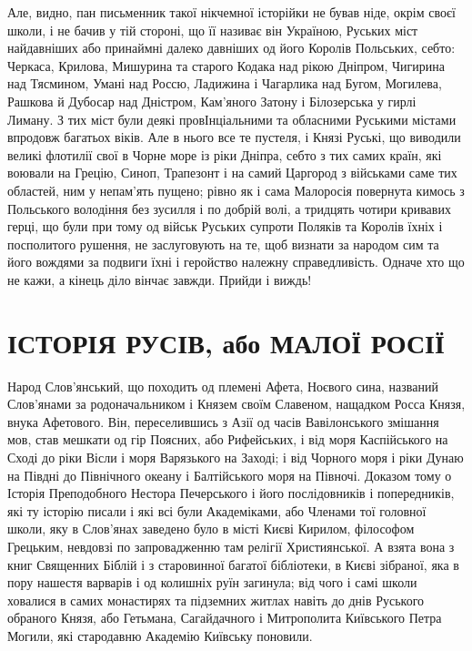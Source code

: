 Але, видно, пан письменник такої нікчемної історійки не бував ніде, окрім своєї
школи, і не бачив у тій стороні, що її називає він Україною, Руських міст
найдавніших або принаймні далеко давніших од його Королів Польських, себто:
Черкаса, Крилова, Мишурина та старого Кодака над рікою Дніпром, Чигирина над
Тясмином, Умані над Россю, Ладижина і Чагарлика над Бугом, Могилева, Рашкова й
Дубосар над Дністром, Кам'яного Затону і Білозерська у гирлі Лиману. З тих міст
були деякі провІнціальними та обласними Руськими містами впродовж багатьох
віків. Але в нього все те пустеля, і Князі Руські, що виводили великі флотилії
свої в Чорне море із ріки Дніпра, себто з тих самих країн, які воювали на
Грецію, Синоп, Трапезонт і на самий Царгород з військами саме тих областей, ним
у непам'ять пущено; рівно як і сама Малоросія повернута кимось з Польського
володіння без зусилля і по добрій волі, а тридцять чотири кривавих герці, що
були при тому од військ Руських супроти Поляків та Королів їхніх і посполитого
рушення, не заслуговують на те, щоб визнати за народом сим та його вождями за
подвиги їхні і геройство належну справедливість. Одначе хто що не кажи, а
кінець діло вінчає завжди. Прийди і виждь!

\section{ІСТОРІЯ РУСІВ, або МАЛОЇ РОСІЇ}

Народ Слов'янський, що походить од племені Афета, Ноєвого сина, названий
Слов'янами за родоначальником і Князем своїм Славеном, нащадком Росса Князя,
внука Афетового. Він, переселившись з Азії од часів Вавілонського змішання мов,
став мешкати од гір Поясних, або Рифейських, і від моря Каспійського на Сході
до ріки Вісли і моря Варязького на Заході; і від Чорного моря і ріки Дунаю на
Півдні до Північного океану і Балтійського моря на Півночі. Доказом тому о
Історія Преподобного Нестора Печерського і його послідовників і попередників,
які ту історію писали і які всі були Академіками, або Членами тої головної
школи, яку в Слов'янах заведено було в місті Києві Кирилом, філософом Грецьким,
невдовзі по запровадженню там релігії Християнської. А взята вона з книг
Священних Біблій і з старовинної багатої бібліотеки, в Києві зібраної, яка в
пору нашестя варварів і од колишніх руїн загинула; від чого і самі школи
ховалися в самих монастирях та підземних житлах навіть до днів Руського
обраного Князя, або Гетьмана, Сагайдачного і Митрополита Київського Петра
Могили, які стародавню Академію Київську поновили.

